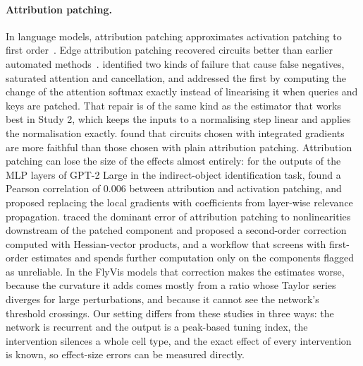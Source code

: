 \paragraph{Attribution patching.}
In language models, attribution patching approximates activation patching to first order~\citep{nanda2023attribution}. Edge attribution patching recovered circuits better than earlier automated methods~\citep{syed2024attribution}. \citet{kramar2024atp} identified two kinds of failure that cause false negatives, saturated attention and cancellation, and addressed the first by computing the change of the attention softmax exactly instead of linearising it when queries and keys are patched. That repair is of the same kind as the estimator that works best in Study 2, which keeps the inputs to a normalising step linear and applies the normalisation exactly. \citet{hanna2024faith} found that circuits chosen with integrated gradients~\citep{sundararajan2017axiomatic} are more faithful than those chosen with plain attribution patching. Attribution patching can lose the size of the effects almost entirely: for the outputs of the MLP layers of GPT-2 Large in the indirect-object identification task, \citet{jafari2025relp} found a Pearson correlation of 0.006 between attribution and activation patching, and proposed replacing the local gradients with coefficients from layer-wise relevance propagation. \citet{zhang2026attribution} traced the dominant error of attribution patching to nonlinearities downstream of the patched component and proposed a second-order correction computed with Hessian-vector products, and a workflow that screens with first-order estimates and spends further computation only on the components flagged as unreliable. In the FlyVis models that correction makes the estimates worse, because the curvature it adds comes mostly from a ratio whose Taylor series diverges for large perturbations, and because it cannot see the network's threshold crossings. Our setting differs from these studies in three ways: the network is recurrent and the output is a peak-based tuning index, the intervention silences a whole cell type, and the exact effect of every intervention is known, so effect-size errors can be measured directly.

